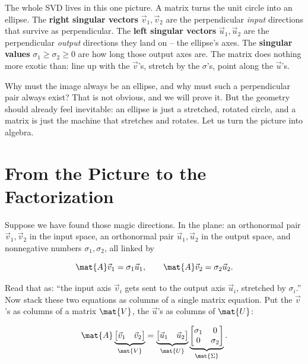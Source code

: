 \begin{intuitionbox}
The whole SVD lives in this one picture. A matrix turns the unit circle into an
ellipse. The \textbf{right singular vectors} $\vec{v}_1, \vec{v}_2$ are the
perpendicular \emph{input} directions that survive as perpendicular. The
\textbf{left singular vectors} $\vec{u}_1, \vec{u}_2$ are the perpendicular
\emph{output} directions they land on -- the ellipse's axes. The
\textbf{singular values} $\sigma_1 \ge \sigma_2 \ge 0$ are how long those output
axes are. The matrix does nothing more exotic than: line up with the
$\vec{v}$'s, stretch by the $\sigma$'s, point along the $\vec{u}$'s.
\end{intuitionbox}

Why must the image always be an ellipse, and why must such a perpendicular pair
always exist? That is not obvious, and we will prove it. But the geometry should
already feel inevitable: an ellipse is just a stretched, rotated circle, and a
matrix is just the machine that stretches and rotates. Let us turn the picture
into algebra.

\section{From the Picture to the Factorization}
\label{ch29:to-factorization}

Suppose we have found those magic directions. In the plane: an orthonormal pair
$\vec{v}_1, \vec{v}_2$ in the input space, an orthonormal pair $\vec{u}_1,
\vec{u}_2$ in the output space, and nonnegative numbers $\sigma_1, \sigma_2$, all
linked by

\[
  \mat{A}\vec{v}_1 = \sigma_1 \vec{u}_1, \qquad
  \mat{A}\vec{v}_2 = \sigma_2 \vec{u}_2.
\]

Read that as: ``the input axis $\vec{v}_i$ gets sent to the output axis
$\vec{u}_i$, stretched by $\sigma_i$.'' Now stack these two equations as columns
of a single matrix equation. Put the $\vec{v}$'s as columns of a matrix
$\mat{V}$, the $\vec{u}$'s as columns of $\mat{U}$:

\[
  \mat{A}\underbrace{\begin{bmatrix} \vec{v}_1 & \vec{v}_2 \end{bmatrix}}_{\mat{V}}
  = \underbrace{\begin{bmatrix} \vec{u}_1 & \vec{u}_2 \end{bmatrix}}_{\mat{U}}
    \underbrace{\begin{bmatrix} \sigma_1 & 0 \\ 0 & \sigma_2 \end{bmatrix}}_{\mat{\Sigma}}.
\]


